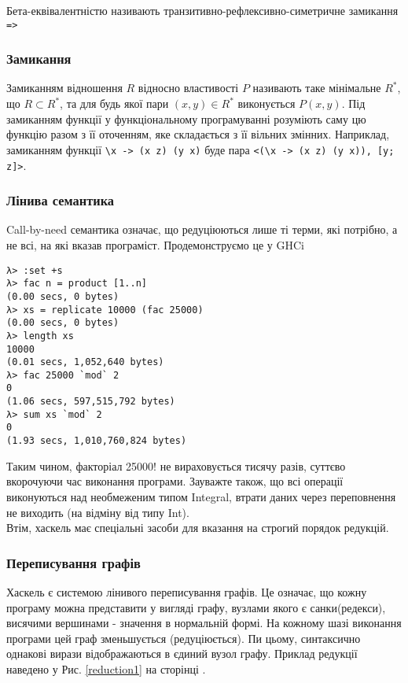 \documentclass[12pt]{article}
\begin{document}
Бета-еквівалентністю називають транзитивно-рефлексивно-симетричне замикання \lstinline{=>}\\

\subsubsection*{Замикання}
Замиканням відношення $R$ відносно властивості $P$ називають таке мінімальне $R^{*}$, що $R \subset R^{*}$, та для будь якої пари $(x,y) \in R^{*}$ виконується $P(x,y)$. Під замиканням функції у функціональному програмуванні розуміють саму цю функцію разом з її оточенням, яке складається з її вільних змінних. Наприклад, замиканням функції \lstinline{\x -> (x z) (y x)} буде пара \lstinline{<(\x -> (x z) (y x)), [y; z]>}.\\

\subsubsection*{Лінива семантика}
Call-by-need семантика означає, що редуціюються лише ті терми, які потрібно, а не всі, на які вказав програміст. Продемонструємо це у GHCi\\

\begin{lstlisting}[caption={Ліниві обчислення}]
λ> :set +s
λ> fac n = product [1..n]
(0.00 secs, 0 bytes)
λ> xs = replicate 10000 (fac 25000)
(0.00 secs, 0 bytes)
λ> length xs
10000
(0.01 secs, 1,052,640 bytes)
λ> fac 25000 `mod` 2
0
(1.06 secs, 597,515,792 bytes)
λ> sum xs `mod` 2
0
(1.93 secs, 1,010,760,824 bytes)
\end{lstlisting}

Таким чином, факторіал 25000! не вираховується тисячу разів, суттєво вкорочуючи час виконання програми. Зауважте також, що всі операції виконуються над необмеженим типом Integral, втрати даних через переповнення не виходить (на відміну від типу Int).\\

Втім, хаскель має спеціальні засоби для вказання на строгий порядок редукцій.\\

\subsubsection*{Переписування графів}
Хаскель є системою лінивого переписування графів. Це означає, що кожну програму можна представити у вигляді графу, вузлами якого є санки(редекси), висячими вершинами - значення в нормальній формі. На кожному шазі виконання програми цей граф зменьшується (редуціюється). Пи цьому, синтаксично однакові вирази відображаються в єдиний вузол графу. Приклад редукції наведено у Рис. \ref{reduction1} на сторінці \pageref{reduction1}.\\
\end{document}
